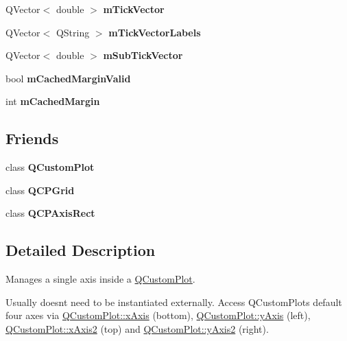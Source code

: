 \begin{DoxyCompactItemize}
Q\+Vector$<$ double $>$ {\bfseries m\+Tick\+Vector}
\item 
\mbox{\label{class_q_c_p_axis_aeee4bd0fca3f587eafe33843d1cb4f82}} 
Q\+Vector$<$ Q\+String $>$ {\bfseries m\+Tick\+Vector\+Labels}
\item 
\mbox{\label{class_q_c_p_axis_a28353081e0ff35c3fe5ced923a287faa}} 
Q\+Vector$<$ double $>$ {\bfseries m\+Sub\+Tick\+Vector}
\item 
\mbox{\label{class_q_c_p_axis_a2cde37b6e385f47e11322df4ac1b0e9b}} 
bool {\bfseries m\+Cached\+Margin\+Valid}
\item 
\mbox{\label{class_q_c_p_axis_a48ace55cbd54f7241e7f1b06fd369b64}} 
int {\bfseries m\+Cached\+Margin}
\end{DoxyCompactItemize}
\subsection*{Friends}
\begin{DoxyCompactItemize}
\item 
\mbox{\label{class_q_c_p_axis_a1cdf9df76adcfae45261690aa0ca2198}} 
class {\bfseries Q\+Custom\+Plot}
\item 
\mbox{\label{class_q_c_p_axis_a061e177f585549fc31f780852e2bd6fe}} 
class {\bfseries Q\+C\+P\+Grid}
\item 
\mbox{\label{class_q_c_p_axis_acbf20ecb140f66c5fd1bc64ae0762990}} 
class {\bfseries Q\+C\+P\+Axis\+Rect}
\end{DoxyCompactItemize}


\subsection{Detailed Description}
Manages a single axis inside a \hyperlink{class_q_custom_plot}{Q\+Custom\+Plot}. 

Usually doesn\textquotesingle{}t need to be instantiated externally. Access Q\+Custom\+Plot\textquotesingle{}s default four axes via \hyperlink{class_q_custom_plot_a9a79cd0158a4c7f30cbc702f0fd800e4}{Q\+Custom\+Plot\+::x\+Axis} (bottom), \hyperlink{class_q_custom_plot_af6fea5679725b152c14facd920b19367}{Q\+Custom\+Plot\+::y\+Axis} (left), \hyperlink{class_q_custom_plot_ada41599f22cad901c030f3dcbdd82fd9}{Q\+Custom\+Plot\+::x\+Axis2} (top) and \hyperlink{class_q_custom_plot_af13fdc5bce7d0fabd640f13ba805c0b7}{Q\+Custom\+Plot\+::y\+Axis2} (right).

